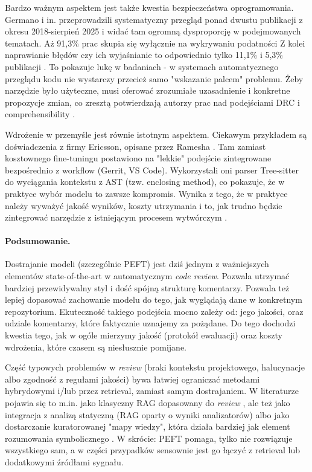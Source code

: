 Bardzo ważnym aspektem jest także kwestia bezpieczeństwa oprogramowania. Germano i in. przeprowadzili systematyczny przegląd ponad dwustu publikacji z okresu 2018-sierpień 
2025 i widać tam ogromną dysproporcję w podejmowanych tematach. Aż 91,3\% prac 
skupia się wyłącznie na wykrywaniu podatności Z kolei naprawianie błędów
czy ich wyjaśnianie to odpowiednio tylko 11,1\% i 5,3\% publikacji \cite{Germano2025VulnSLR}. 
To pokazuje lukę w badaniach - w systemach automatycznego przeglądu kodu nie wystarczy przecież 
samo "wskazanie palcem" problemu. Żeby narzędzie było użyteczne, musi oferować zrozumiałe uzasadnienie 
i konkretne propozycje zmian, co zresztą potwierdzają autorzy prac nad podejściami DRC 
i comprehensibility \cite{Yu2024Carllm,Yu2025Desiview}.

Wdrożenie w przemyśle jest równie istotnym aspektem. Ciekawym przykładem są doświadczenia z firmy Ericsson, opisane przez 
Ramesha \cite{Ramesh2025EricssonExperience}. Tam zamiast kosztownego fine-tuningu postawiono na "lekkie" podejście zintegrowane bezpośrednio 
z workflow (Gerrit, VS Code). Wykorzystali oni parser Tree-sitter do wyciągania kontekstu 
z AST (tzw. enclosing method), co pokazuje, że w praktyce wybór modelu to zawsze kompromis. 
Wynika z tego, że w praktyce należy wyważyć jakość wyników, koszty utrzymania 
i to, jak trudno będzie zintegrować narzędzie z istniejącym procesem wytwórczym \cite{Ramesh2025EricssonExperience}.

\paragraph{Podsumowanie.}
Dostrajanie modeli (szczególnie PEFT) jest dziś jednym z ważniejszych elementów state-of-the-art w 
automatycznym \emph{code review}. Pozwala utrzymać bardziej przewidywalny styl i dość 
spójną strukturę komentarzy. Pozwala też lepiej dopasować zachowanie modelu do tego, jak 
wyglądają dane w konkretnym repozytorium. Ekuteczność takiego podejścia mocno zależy od: jego jakości, oraz udziale komentarzy, które 
faktycznie uznajemy za pożądane. Do tego dochodzi kwestia tego, jak w ogóle 
mierzymy jakość (protokół ewaluacji) oraz koszty wdrożenia, które czasem są niesłusznie pomijane.

Część typowych problemów w \emph{review} (braki kontekstu projektowego, halucynacje albo zgodność z regułami jakości) bywa
łatwiej ograniczać metodami hybrydowymi i/lub przez retrieval, zamiast samym dostrajaniem. W literaturze pojawia się to m.in. jako klasyczny 
RAG dopasowany do \emph{review} \cite{Meng2025RARe}, ale też jako integracja z analizą statyczną 
(RAG oparty o wyniki analizatorów) \cite{Jaoua2025LLMStaticAnalyzersCR} albo jako dostarczanie kuratorowanej "mapy wiedzy", 
która działa bardziej jak element rozumowania symbolicznego \cite{Icoz2025SymbolicReasoning}. W skrócie: PEFT pomaga, 
tylko nie rozwiązuje wszystkiego sam, a w części przypadków sensownie jest go 
łączyć z retrieval lub dodatkowymi źródłami sygnału.
